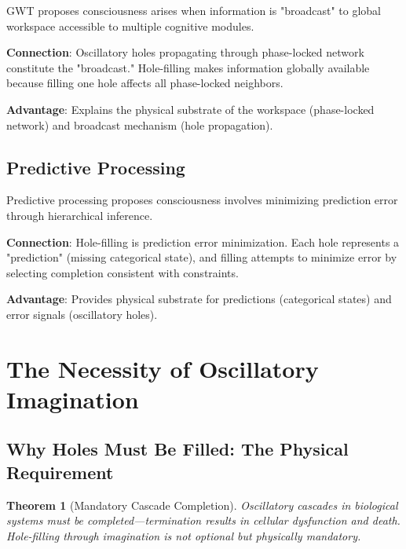 \documentclass[11pt,a4paper]{article}
\newtheorem{theorem}{Theorem}
\begin{document}
GWT \cite{baars1988cognitive} proposes consciousness arises when information is "broadcast" to global workspace accessible to multiple cognitive modules.

\textbf{Connection}: Oscillatory holes propagating through phase-locked network constitute the "broadcast." Hole-filling makes information globally available because filling one hole affects all phase-locked neighbors.

\textbf{Advantage}: Explains the physical substrate of the workspace (phase-locked network) and broadcast mechanism (hole propagation).

\subsection{Predictive Processing}

Predictive processing \cite{friston2010free} proposes consciousness involves minimizing prediction error through hierarchical inference.

\textbf{Connection}: Hole-filling is prediction error minimization. Each hole represents a "prediction" (missing categorical state), and filling attempts to minimize error by selecting completion consistent with constraints.

\textbf{Advantage}: Provides physical substrate for predictions (categorical states) and error signals (oscillatory holes).

\section{The Necessity of Oscillatory Imagination}

\subsection{Why Holes Must Be Filled: The Physical Requirement}

\begin{theorem}[Mandatory Cascade Completion]
\label{thm:mandatory_completion}
Oscillatory cascades in biological systems must be completed—termination results in cellular dysfunction and death. Hole-filling through imagination is not optional but physically mandatory.
\end{theorem}
\end{document}

